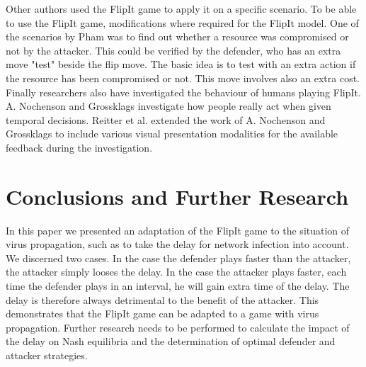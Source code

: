 \documentclass[journal,a4paper]{IEEEtran}
\begin{document}
Other authors used the FlipIt game to apply it on a specific scenario. To be able to use the FlipIt game, modifications where required for the FlipIt model.
One of the scenarios by Pham \cite{compromised} was to find out whether a resource was compromised or not by the attacker. This could be verified by the defender, who has an extra move "test" beside the flip move. The basic idea is to test with an extra action if the resource has been compromised or not. This move involves also an extra cost.\\

Finally researchers also have investigated the behaviour of humans playing FlipIt. A. Nochenson and Grossklags \cite{nochenson2013behavioral}  investigate how people really act when given temporal decisions. Reitter et al. \cite{reitter2013risk} extended the work of A. Nochenson and Grossklags to include various visual presentation modalities for the available feedback during the investigation.

\section{Conclusions and Further Research}
\label{ch:conclusion}
In this paper we presented an adaptation of the FlipIt game to the situation of virus propagation, such as to take the delay for network infection into account. We discerned two cases. In the case the defender plays faster than the attacker, the attacker simply looses the delay. In the case the attacker plays faster, each time the defender plays in an interval, he will gain extra time of the delay. The delay is therefore always detrimental to the benefit of the attacker. 
This demonstrates that the FlipIt game can be adapted to a game with virus propagation. Further research needs to be performed to calculate the impact of the delay on Nash equilibria and the determination of optimal defender and attacker strategies.



\end{document}
